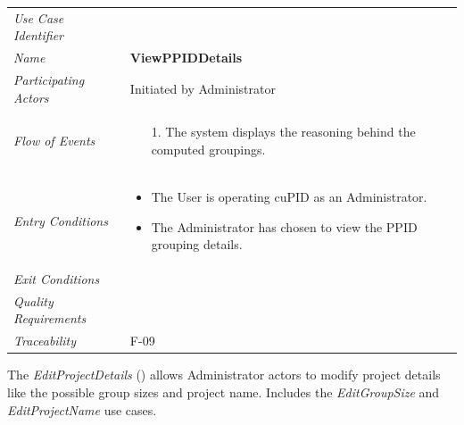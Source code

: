 \documentclass[12pt,letterpaper]{article}
\begin{document}
\begin{center}
	\begin{tabu} to 
		\toprule
		Use Case Identifier & \viewppiddetails{} \\
		Name & {\bf ViewPPIDDetails} \\
		Participating Actors & Initiated by Administrator \\
		Flow of Events & 
		\begin{minipage}[t]{\linewidth}
		    \begin{enumerate}
		        \item[1.] The system displays the reasoning behind the computed groupings.
			\end{enumerate}
	    \end{minipage} \\

		Entry Conditions &
		\begin{minipage}[t]{\linewidth}
			\begin{itemize}
			    \item The User is operating cuPID as an Administrator.
			    \item The Administrator has chosen to view the PPID grouping details.
	        \end{itemize}
	    \end{minipage} \\

		Exit Conditions & \\

		Quality Requirements & \\

		Traceability & F-09 \\
		\toprule
	\end{tabu}
\end{center}

\newpage{}

The {\it EditProjectDetails} ({\bf \editprojectdetails{}}) allows Administrator actors to modify project details like the possible group sizes and project name. Includes the {\it EditGroupSize} and {\it EditProjectName} use cases.
\end{document}
